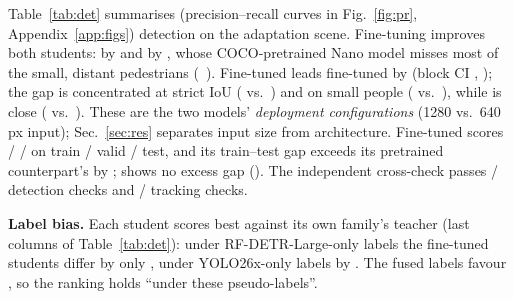 Table~\ref{tab:det} summarises (precision--recall curves in Fig.~\ref{fig:pr}, Appendix~\ref{app:figs}) detection on the adaptation scene. Fine-tuning improves both
students: \yolo{} by \DeltaYoloFtPt{} \AP{} and \rfdetr{} by \DeltaRfFtPt{}, whose COCO-pretrained Nano model misses
most of the small, distant pedestrians (\APsm{}~\ApSmallRfPt). Fine-tuned \yolo{} leads fine-tuned \rfdetr{} by
\DeltaFtFt{} \AP{} (block CI \ci{\TcAaCbbBFtFtLo}{\TcAaCbbBFtFtHi}, \TcAaCbbBFtFtP); the gap is concentrated at strict
IoU (\APs{} \ApSeventyFiveYoloFt{} vs.\ \ApSeventyFiveRfFt) and on small people (\APsm{} \ApSmallYoloFt{} vs.\
\ApSmallRfFt), while \APf{} is close (\ApFiftyYoloFt{} vs.\ \ApFiftyRfFt). These are the two models'
\emph{deployment configurations} (1280 vs.\ 640\,px input); Sec.~\ref{sec:res} separates input size from
architecture. Fine-tuned \yolo{} scores \ApTrainYoloFt{} / \ApValidYoloFt{} / \ApTestYoloFt{} on train / valid /
test, and its train--test gap exceeds its pretrained counterpart's by \ExcessYoloFt{}; \rfdetr{} shows no excess
gap (\ExcessRfFt). The independent cross-check passes \XcPass/\XcTotal{} detection checks\ifHaveTrackXc{} and
\XtPass/\XtTotal{} tracking checks\fi.



\textbf{Label bias.} Each student scores best against its own family's teacher (last columns of
Table~\ref{tab:det}): under RF-DETR-Large-only labels the fine-tuned students differ by only \TbGapRfL{} \AP{}, under
YOLO26x-only labels by \TbGapYx. The fused labels favour \yolo{}, so the ranking holds ``under these pseudo-labels''.


